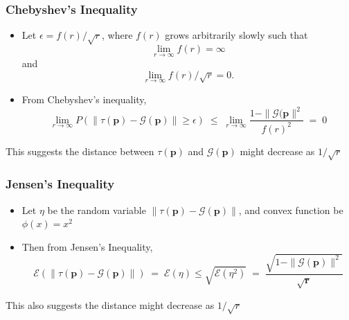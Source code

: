 \documentclass[aspectratio=169]{beamer}
\begin{document}
  \begin{frame}
    \frametitle{Chebyshev's Inequality}
    \begin{itemize}
      \item{Let $\epsilon = f(r)/\sqrt{r}$, where $f(r)$ grows arbitrarily slowly such that 
	\[
	\lim_{r \to \infty} f(r)  =  \infty
	\]
	and 
	\[
	\lim_{r \to \infty} f(r)/\sqrt{r}  =  0.
	\]
      }
      \item{From Chebyshev's inequality,
	\[
	  \lim_{r \to \infty} P(\| \tau (\bm{p}) - \mathcal{G}(\bm{p}) \| \geq \epsilon) \; \leq \; 
	  \lim_{r \to \infty}\frac{1 - \|\mathcal{G}(\bm{p}\|^2} {{f(r)}^2} \; = \; 0
	\]
      }      
    \end{itemize}
    This suggests the distance between $\tau(\bm{p})$ and $\mathcal{G}(\bm{p})$ might decrease as $1/\sqrt{r}$
  \end{frame}
  
  \begin{frame}
    \frametitle{Jensen's Inequality}
    \begin{itemize}
      \item{Let $\eta$ be the random variable $\| \tau (\bm{p}) - \mathcal{G}(\bm{p}) \|$, and convex function be $\phi (x) = x^2$}
      \item{Then from Jensen's Inequality, 
	\[
	  \mathcal{E}(\| \tau (\bm{p}) - \mathcal{G}(\bm{p}) \|) \;=\; \mathcal{E}(\eta) \leq \sqrt{\mathcal{E}(\eta^2)} \;=\; 
	  \frac{\sqrt{1 - \|\mathcal{G}(\bm{p})\|^2}}{\sqrt{\bm{r}}}
	\]
      }
    \end{itemize}
    This also suggests the distance might decrease as $1/\sqrt{r}$
  \end{frame}
  
\end{document}
